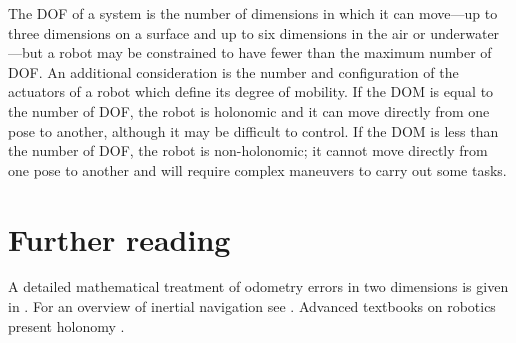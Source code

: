The DOF of a system is the number of dimensions in which it can move---up to three dimensions on a surface and up to six dimensions in the air or underwater---but a robot may be constrained to have fewer than the maximum number of DOF. An additional consideration is the number and configuration of the actuators of a robot which define its degree of mobility. If the DOM is equal to the number of DOF, the robot is holonomic and it can move directly from one pose to another, although it may be difficult to control. If the DOM is less than the number of DOF, the robot is non-holonomic; it cannot move directly from one pose to another and will require complex maneuvers to carry out some tasks.

\section{Further reading}

A detailed mathematical treatment of odometry errors in two dimensions is given in \cite[Sect.~5.24]{siegwart}. For an overview of inertial navigation see \cite{king,oxford}. Advanced textbooks on robotics present holonomy \cite{correll,craig,siegwart,spong}.



